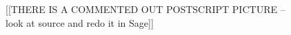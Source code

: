 \documentclass{report}
\begin{document}
\begin{figure}\label{fig:graphreal}
\begin{center}
  [[THERE IS A COMMENTED OUT POSTSCRIPT PICTURE -- look at source and
  redo it in Sage]]








\end{center}
\end{figure}
\end{document}

